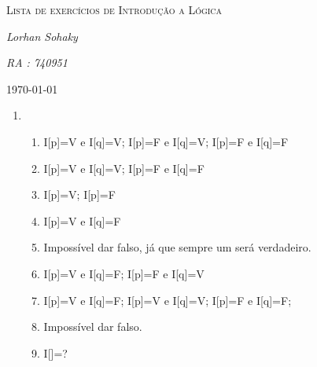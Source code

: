 \documentclass[12pt]{article}
\begin{document}
	\begin{titlepage}
		\centering
			{\scshape\LARGE Lista de exercícios de Introdução a Lógica \par}
		\vspace{4cm}
			{\Large\itshape Lorhan Sohaky\par}
		\vspace{0.3cm}
			{\scshape\itshape RA : 740951\par}
		\vfill
	{\large \today\par}
	\end{titlepage}
	
	\begin{enumerate}
	  \item \begin{enumerate}
	    		\item I[p]=V e I[q]=V; I[p]=F e I[q]=V; I[p]=F e I[q]=F
	    		\item I[p]=V e I[q]=V; I[p]=F e I[q]=F
	    		\item I[p]=V; I[p]=F
	    		\item I[p]=V e I[q]=F
	    		\item Impossível dar falso, já que sempre um será verdadeiro.
	    		\item I[p]=V e I[q]=F; I[p]=F e I[q]=V
	    		\item I[p]=V e I[q]=F; I[p]=V e I[q]=V; I[p]=F e I[q]=F;
	    		\item Impossível dar falso.
	    		\item I[\alpha]=?
	    		  
	  		\end{enumerate}
	\end{enumerate}
\end{document}
